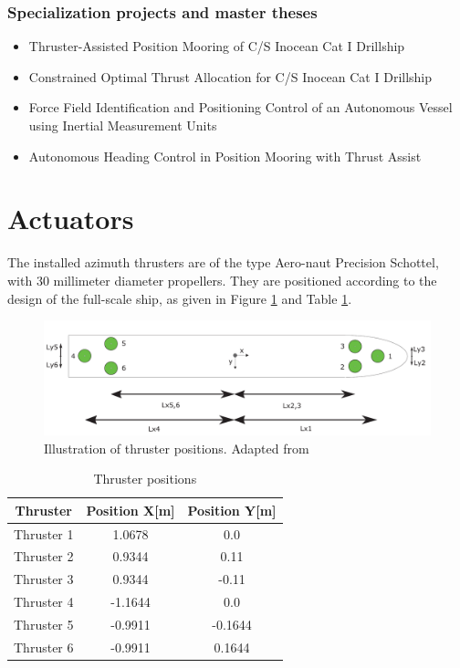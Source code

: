 \subsubsection{Specialization projects and master theses}
\begin{itemize}
	\item Thruster-Assisted Position Mooring of C/S Inocean Cat I Drillship \citep{bjorno2016thruster}
	\item Constrained Optimal Thrust Allocation for C/S Inocean Cat I Drillship \citep{frederich2016constrained}
	\item Force Field Identification and Positioning Control of an Autonomous Vessel using Inertial Measurement Units \citep{udjus2017}
	\item Autonomous Heading Control in Position Mooring with Thrust Assist \citep{johannessen2017}
\end{itemize}

\section{Actuators}
The installed azimuth thrusters are of the type Aero-naut Precision Schottel, with 30 millimeter diameter propellers. They are positioned according to the design of the full-scale ship, as given in Figure \ref{fig:thruster_positions} and Table \ref{tab:thruster_positions}. 
\begin{figure}[htb!]
	\centering
	\includegraphics[width=\linewidth]{fig/thruster_position.png}
	\caption{Illustration of thruster positions. Adapted from \cite{frederich2016constrained}}
	\label{fig:thruster_positions}
\end{figure}
\begin{table}[htb!]
	\centering
	\caption{Thruster positions}
	\label{tab:thruster_positions}
	\begin{tabular}{ccc}
		\hline
		\textbf{Thruster} & \textbf{Position X}[m] & \textbf{Position Y}[m]\\ \hline
		Thruster 1 & 1.0678 & 0.0\\
		Thruster 2 & 0.9344 & 0.11\\
		Thruster 3 & 0.9344 & -0.11\\
		Thruster 4 & -1.1644 & 0.0\\
		Thruster 5 & -0.9911 & -0.1644\\
		Thruster 6 & -0.9911 & 0.1644\\ \hline
	\end{tabular}
\end{table}

